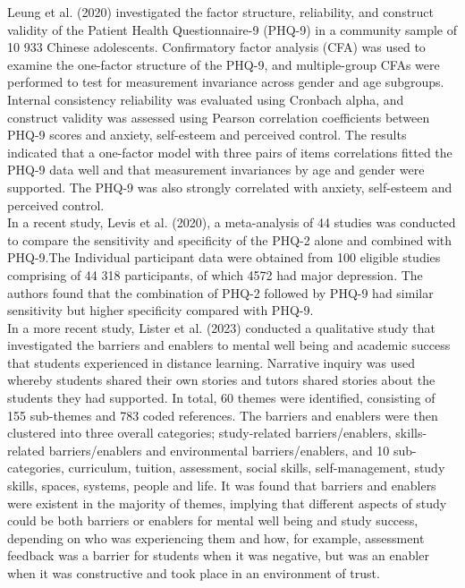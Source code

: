 \documentclass[12pt]{article}\usepackage[]{graphicx}\usepackage[]{xcolor}
\numberwithin{equation}{section}
\numberwithin{figure}{section}
\begin{document}
	\noindent Leung et al. (2020) investigated the factor structure, reliability, and construct validity of the Patient Health Questionnaire-9 (PHQ-9) in a community sample of 10 933 Chinese adolescents. Confirmatory factor analysis (CFA) was used to examine the one-factor structure of the PHQ-9, and multiple-group CFAs were performed to test for measurement invariance across gender and age subgroups. Internal consistency reliability was evaluated using Cronbach alpha, and construct validity was assessed using Pearson correlation coefficients between PHQ-9 scores and anxiety, self-esteem and perceived control. The results indicated that a one-factor model with three pairs of items correlations fitted the PHQ-9 data well and that measurement invariances by age and gender were supported. The PHQ-9 was also strongly correlated with anxiety, self-esteem and perceived control.\\
	
	\noindent In a recent study, Levis et al. (2020), a meta-analysis of 44 studies was conducted to compare the sensitivity and specificity of the PHQ-2 alone and combined with PHQ-9.The Individual participant data were obtained from 100 eligible studies comprising of 44 318 participants, of which 4572 had major depression. The authors found that the combination of PHQ-2 followed by PHQ-9 had similar sensitivity but higher specificity compared with PHQ-9.\\
	
	\noindent In a more recent study, Lister et al. (2023) conducted a qualitative study that investigated the barriers and enablers to mental well being and academic success that students experienced in distance learning. Narrative inquiry was used whereby students shared their own stories and tutors shared stories about the students they had supported. In total, 60 themes were identified, consisting of 155 sub-themes and 783 coded references. The barriers and enablers were then clustered into three overall categories; study-related barriers/enablers, skills-related barriers/enablers and environmental barriers/enablers, and 10 sub-categories, curriculum, tuition, assessment, social skills, self-management, study skills, spaces, systems, people and life. It was found that barriers and enablers were existent in the majority of themes, implying that different aspects of study could be both barriers or enablers for mental well being and study success, depending on who was experiencing them and how, for example, assessment feedback was a barrier for students when it was negative, but was an enabler when it was constructive and took place in an environment of trust.\\
	
\end{document}
